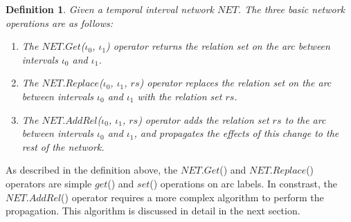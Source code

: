 \documentclass[11pt]{report}
\newtheorem{vdefinition}{Definition}[chapter]
\begin{document}
          \begin{vdefinition}
            \label{defn-tempo-netop}
            Given a temporal interval network $NET$. The three basic network
            operations are as follows:

            \begin{enumerate}
              \item
                The $NET.Get$($\iota_0$, $\iota_1$) operator returns the
                relation set on the arc between intervals $\iota_0$ and
                $\iota_1$.

              \item
                The $NET$.$Replace$($\iota_0$, $\iota_1$, $rs$) operator
                replaces the relation set on the arc between intervals
                $\iota_0$ and $\iota_1$ with the relation set $rs$.
              \item
                The $NET.AddRel$($\iota_0$, $\iota_1$, $rs$) operator adds the
                relation set $rs$ to the arc between intervals $\iota_0$ and
                $\iota_1$, and propagates the effects of this change to the
                rest of the network.
            \end{enumerate}
          \end{vdefinition}

          As described in the definition above, the $NET.Get$() and
          $NET.Replace$() operators are simple $get$() and $set$() operations
          on arc labels. In constrast, the $NET.AddRel$() operator requires a
          more complex algorithm to perform the propagation. This algorithm is
          discussed in detail in the next section.
\end{document}
